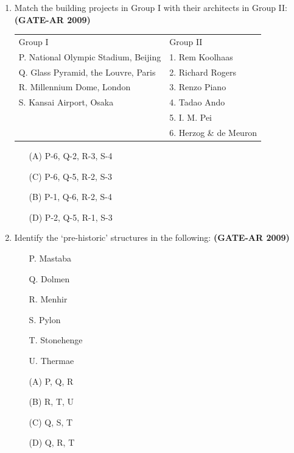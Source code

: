 \documentclass[a4paper,10pt]{article}
\begin{document}
\begin{enumerate}
    \item Match the building projects in Group I with their architects in Group II: \hfill \textbf{(GATE-AR 2009)} \\
    \begin{tabular}{ p p }
	Group I & Group II \\
	P. National Olympic Stadium, Beijing & 1. Rem Koolhaas \\
	Q. Glass Pyramid, the Louvre, Paris & 2. Richard Rogers \\
	R. Millennium Dome, London & 3. Renzo Piano \\
	S. Kansai Airport, Osaka & 4. Tadao Ando \\
	& 5. I. M. Pei \\
	& 6. Herzog \& de Meuron \\
	\end{tabular}
	\begin{multicols}{2}
	\begin{itemize}
        \item[(A)] P-6, Q-2, R-3, S-4
        \item[(C)] P-6, Q-5, R-2, S-3
        \item[(B)] P-1, Q-6, R-2, S-4
        \item[(D)] P-2, Q-5, R-1, S-3
    \end{itemize}
	\end{multicols}

    \item Identify the ‘pre-historic’ structures in the following: \hfill \textbf{(GATE-AR 2009)}
    \begin{itemize}
        \item[P.] Mastaba
        \item[Q.] Dolmen
        \item[R.] Menhir
        \item[S.] Pylon
        \item[T.] Stonehenge
        \item[U.] Thermae
    \end{itemize}
    \begin{multicols}{4}
	\begin{itemize}
        \item[(A)] P, Q, R
        \item[(B)] R, T, U
        \item[(C)] Q, S, T
        \item[(D)] Q, R, T
    \end{itemize}
	\end{multicols}


\end{enumerate}
\end{document}
